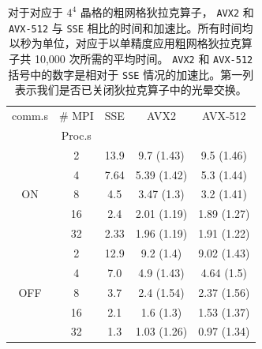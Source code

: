\documentclass[5p,times,a4paper,fleqn]{cas-dc}
\begin{document}
   \begin{table}
    \centering
    \caption{对于对应于    $4^4$    晶格的粗网格狄拉克算子，   \texttt{AVX2}    和    \texttt{AVX-512}    与    \texttt{SSE}    相比的时间和加速比。所有时间均以秒为单位，对应于以单精度应用粗网格狄拉克算子共 10,000 次所需的平均时间。   \texttt{AVX2}    和    \texttt{AVX-512}    括号中的数字是相对于    \texttt{SSE}    情况的加速比。第一列表示我们是否已关闭狄拉克算子中的光晕交换。  }
    \label{tab:avx_vs_sse_coarse_grid_Dirac_4to4}
    \begin{tabular}{ccccc}
    \hline
    comm.s                 &  \#  MPI   & SSE   & AVX2        & AVX-512      \\ 
                           & Proc.s   &       &             &              \\  \hline
    \multirow{5}{*}{ON}    & 2        & 13.9  & 9.7  (1.43) & 9.5 (1.46)   \\ 
                           & 4        & 7.64  & 5.39 (1.42) & 5.3 (1.44)   \\ 
                           & 8        & 4.5   & 3.47 (1.3)  & 3.2 (1.41)   \\ 
                           & 16       & 2.4   & 2.01 (1.19) & 1.89 (1.27)  \\ 
                           & 32       & 2.33  & 1.96 (1.19) & 1.91 (1.22)  \\  \hline
    \multirow{5}{*}{OFF}   & 2        & 12.9  & 9.2 (1.4)   & 9.02 (1.43)  \\ 
                           & 4        & 7.0   & 4.9 (1.43)  & 4.64 (1.5)   \\ 
                           & 8        & 3.7   & 2.4 (1.54)  & 2.37 (1.56)  \\ 
                           & 16       & 2.1   & 1.6 (1.3)   & 1.53 (1.37)  \\ 
                           & 32       & 1.3   & 1.03 (1.26) & 0.97 (1.34)             \\  \hline
    \end{tabular}
\end{table}     
\end{document}
